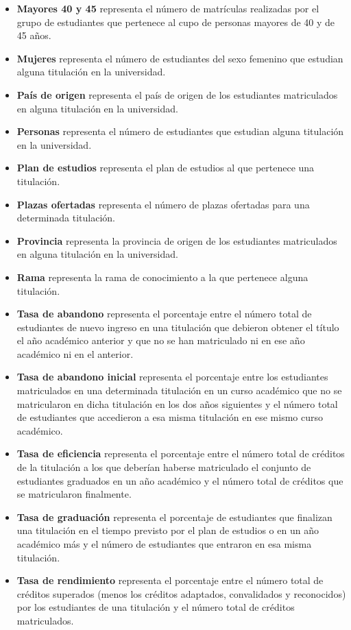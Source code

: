 \begin{itemize}
	\item \textbf{Mayores 40 y 45 } representa el número de matrículas realizadas por el grupo de estudiantes que pertenece al cupo de personas mayores de 40 y de 45 años.
	\item \textbf{Mujeres} representa el número de estudiantes del sexo femenino que estudian alguna titulación en la universidad.
	\item \textbf{País de origen} representa el país de origen de los estudiantes matriculados en alguna titulación en la universidad.
	\item \textbf{Personas} representa el número de estudiantes que estudian alguna titulación en la universidad.
	\item \textbf{Plan de estudios} representa el plan de estudios al que pertenece una titulación.
	\item \textbf{Plazas ofertadas} representa el número de plazas ofertadas para una determinada titulación.
	\item \textbf{Provincia} representa la provincia de origen de los estudiantes matriculados en alguna titulación en la universidad.
	\item \textbf{Rama} representa la rama de conocimiento a la que pertenece alguna titulación.
	\item \textbf{Tasa de abandono} representa el porcentaje entre el número total de estudiantes de nuevo ingreso en una titulación que debieron obtener el título el año académico anterior y que no se han matriculado ni en ese año académico ni en el anterior.
	\item \textbf{Tasa de abandono inicial} representa el porcentaje entre los estudiantes matriculados en una determinada titulación en un curso académico que no se matricularon en dicha titulación en los dos años siguientes y el número total de estudiantes que accedieron a esa misma titulación en ese mismo curso académico.
	\item \textbf{Tasa de eficiencia} representa el porcentaje entre el número total de créditos de la titulación a los que deberían haberse matriculado el conjunto de estudiantes graduados en un año académico y el número total de créditos que se matricularon finalmente.
	\item \textbf{Tasa de graduación} representa el porcentaje de estudiantes que finalizan una titulación en el tiempo previsto por el plan de estudios o en un año académico más y el número de estudiantes que entraron en esa misma titulación.
	\item \textbf{Tasa de rendimiento} representa el porcentaje entre el número total de créditos superados (menos los créditos adaptados, convalidados y reconocidos) por los estudiantes de una titulación y el número total de créditos matriculados.

\end{itemize}
